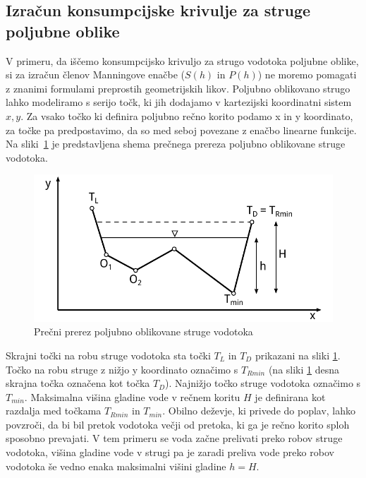 \subsection{Izračun konsumpcijske krivulje za struge poljubne oblike} \label{sec:teorija_metodaPoljubnaOblika}


V primeru, da iščemo konsumpcijsko krivuljo za strugo vodotoka poljubne oblike, si za izračun členov Manningove enačbe ($S(h)$ in $P(h)$) ne moremo pomagati z znanimi formulami preprostih geometrijskih likov. Poljubno oblikovano strugo lahko modeliramo s serijo točk, ki jih dodajamo v kartezijski koordinatni sistem $x,y$. Za vsako točko ki definira poljubno rečno korito podamo x in y koordinato, za točke pa predpostavimo, da so med seboj povezane z enačbo linearne funkcije. Na sliki~\ref{fig:poljubnaStruga} je predstavljena shema prečnega prereza poljubno oblikovane struge vodotoka.

\begin{figure}[ht!]
	\begin{centering}
		\includegraphics{slike/customChannel/customStruga.pdf}\caption{Prečni prerez poljubno oblikovane struge vodotoka}\label{fig:poljubnaStruga}
	\end{centering}
\end{figure}



Skrajni točki na robu struge vodotoka sta točki $T_L$ in $T_D$ prikazani na sliki \ref{fig:poljubnaStruga}. Točko na robu struge z nižjo y koordinato označimo s $T_{Rmin}$ (na sliki \ref{fig:poljubnaStruga} desna skrajna točka označena kot točka $T_D$). Najnižjo točko struge vodotoka označimo s $T_{min}$. Maksimalna višina gladine vode v rečnem koritu $H$ je definirana kot razdalja med točkama $T_{Rmin}$ in $T_{min}$. Obilno deževje, ki privede do poplav, lahko povzroči, da bi bil pretok vodotoka večji od pretoka, ki ga je rečno korito sploh sposobno prevajati. V tem primeru se voda začne prelivati preko robov struge vodotoka, višina gladine vode v strugi pa je zaradi preliva vode preko robov vodotoka še vedno enaka maksimalni višini gladine $h=H$.



